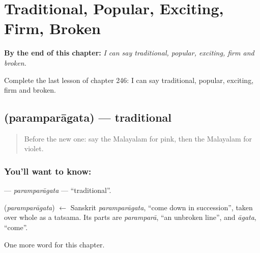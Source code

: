 
\chapter{Traditional, Popular, Exciting, Firm, Broken}
\label{ch:ml-traditional-popular-exciting-firm-broken}

\begin{chapteropening}
\textbf{By the end of this chapter:} \emph{I can say traditional, popular, exciting, firm and broken.}

Complete the last lesson of chapter 246: I can say traditional, popular, exciting, firm and broken.
\end{chapteropening}

\section[\texorpdfstring{\ml{പരമ്പരാഗത} (paramparāgata)}{പരമ്പരാഗത (paramparāgata)}]{ (paramparāgata) — traditional}

\label{lesson:ML-C246-paramparagata}



\begin{quote}
Before the new one: say the Malayalam for pink, then the Malayalam for violet.
\end{quote}

\subsection*{You'll want to know: }
\textbf{} — \emph{paramparāgata} — \textquotedblleft{}traditional\textquotedblright{}.

\begin{cousinweb}
\textbf{} (\emph{paramparāgata}) $\leftarrow$ Sanskrit \emph{paramparāgata}, \textquotedblleft{}come down in succession\textquotedblright{}, taken over whole as a tatsama. Its parts are \emph{paramparā}, \textquotedblleft{}an unbroken line\textquotedblright{}, and \emph{āgata}, \textquotedblleft{}come\textquotedblright{}.
\end{cousinweb}

\begin{grammarlens}[title={What you've built}]
One more word for this chapter.
\end{grammarlens}

